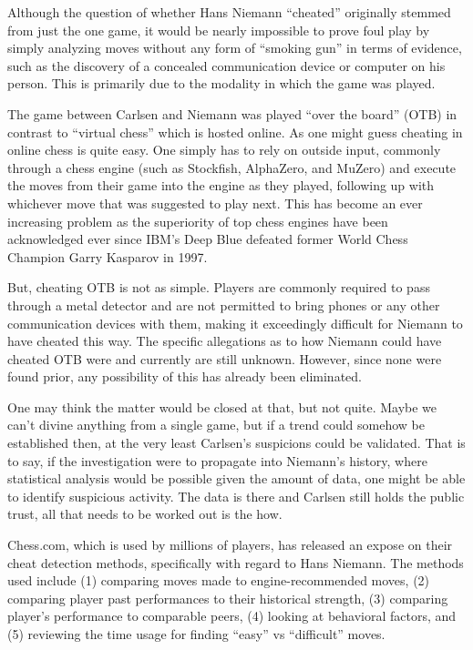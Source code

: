 \documentclass[12pt, letterpaper, titlepage]{article}
\begin{document}
Although the question of whether Hans Niemann “cheated” originally stemmed from just the one game, it would be nearly impossible to prove foul play by simply analyzing moves without any form of “smoking gun” in terms of evidence, such as the discovery of a concealed communication device or computer on his person. This is primarily due to the modality in which the game was played.

The game between Carlsen and Niemann was played “over the board” (OTB) in contrast to “virtual chess” which is hosted online. As one might guess cheating in online chess is quite easy. One simply has to rely on outside input, commonly through a chess engine (such as Stockfish, AlphaZero, and MuZero) and execute the moves from their game into the engine as they played, following up with whichever move that was suggested to play next. This has become an ever increasing problem as the superiority of top chess engines have been acknowledged ever since IBM's Deep Blue defeated former World Chess Champion Garry Kasparov in 1997.

But, cheating OTB is not as simple. Players are commonly required to pass through a metal detector and are not permitted to bring phones or any other communication devices with them, making it exceedingly difficult for Niemann to have cheated this way. The specific allegations as to how Niemann could have cheated OTB were and currently are still unknown. However, since none were found prior, any possibility of this has already been eliminated.

One may think the matter would be closed at that, but not quite. Maybe we can't divine anything from a single game, but if a trend could somehow be established then, at the very least Carlsen's suspicions could be validated. That is to say, if the investigation were to propagate into Niemann's history, where statistical analysis would be possible given the amount of data, one might be able to identify suspicious activity. The data is there and Carlsen still holds the public trust, all that needs to be worked out is the how.

Chess.com, which is used by millions of players, has released an expose on their cheat detection methods, specifically with regard to Hans Niemann. The methods used include (1) comparing moves made to engine-recommended moves, (2) comparing player past performances to their historical strength, (3) comparing player's performance to comparable peers, (4) looking at behavioral factors, and (5) reviewing the time usage for finding “easy” vs “difficult” moves.
\end{document}
